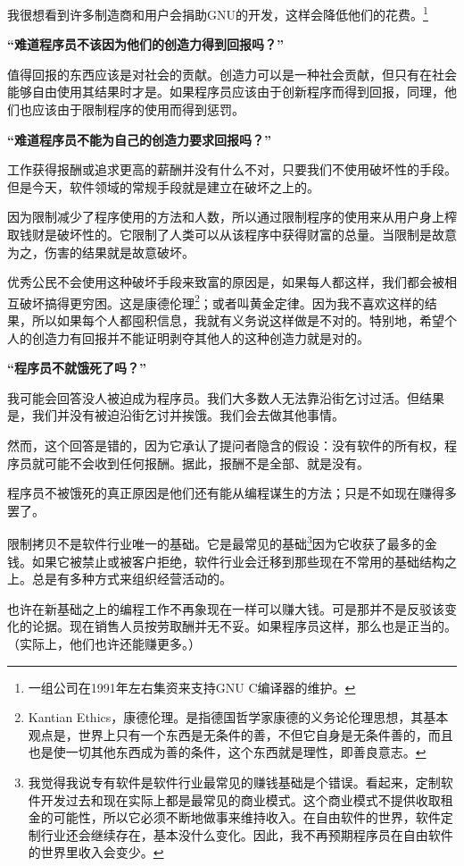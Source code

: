 我很想看到许多制造商和用户会捐助GNU的开发，这样会降低他们的花费。\footnote{一组公司在1991年左右集资来支持GNU C编译器的维护。}\par
\bf“难道程序员不该因为他们的创造力得到回报吗？”\normalall\par
值得回报的东西应该是对社会的贡献。创造力可以是一种社会贡献，但只有在社会能够自由使用其结果时才是。如果程序员应该由于创新程序而得到回报，同理，他们也应该由于限制程序的使用而得到惩罚。\par
\bf“难道程序员不能为自己的创造力要求回报吗？”\normalall\par
工作获得报酬或追求更高的薪酬并没有什么不对，只要我们不使用破坏性的手段。但是今天，软件领域的常规手段就是建立在破坏之上的。\par
因为限制减少了程序使用的方法和人数，所以通过限制程序的使用来从用户身上榨取钱财是破坏性的。它限制了人类可以从该程序中获得财富的总量。当限制是故意为之，伤害的结果就是故意破坏。\par
优秀公民不会使用这种破坏手段来致富的原因是，如果每人都这样，我们都会被相互破坏搞得更穷困。这是康德伦理\footnote{Kantian Ethics，康德伦理。是指德国哲学家康德的义务论伦理思想，其基本观点是，世界上只有一个东西是无条件的善，不但它自身是无条件善的，而且也是使一切其他东西成为善的条件，这个东西就是理性，即善良意志。}；或者叫黄金定律。因为我不喜欢这样的结果，所以如果每个人都囤积信息，我就有义务说这样做是不对的。特别地，希望个人的创造力有回报并不能证明剥夺其他人的这种创造力就是对的。\par
\bf“程序员不就饿死了吗？”\normalall\par
我可能会回答没人被迫成为程序员。我们大多数人无法靠沿街乞讨过活。但结果是，我们并没有被迫沿街乞讨并挨饿。我们会去做其他事情。\par
然而，这个回答是错的，因为它承认了提问者隐含的假设：没有软件的所有权，程序员就可能不会收到任何报酬。据此，报酬不是全部、就是没有。\par
程序员不被饿死的真正原因是他们还有能从编程谋生的方法；只是不如现在赚得多罢了。\par
限制拷贝不是软件行业唯一的基础。它是最常见的基础\footnote{我觉得我说专有软件是软件行业最常见的赚钱基础是个错误。看起来，定制软件开发过去和现在实际上都是最常见的商业模式。这个商业模式不提供收取租金的可能性，所以它必须不断地做事来维持收入。在自由软件的世界，软件定制行业还会继续存在，基本没什么变化。因此，我不再预期程序员在自由软件的世界里收入会变少。}因为它收获了最多的金钱。如果它被禁止或被客户拒绝，软件行业会迁移到那些现在不常用的基础结构之上。总是有多种方式来组织经营活动的。\par
也许在新基础之上的编程工作不再象现在一样可以赚大钱。可是那并不是反驳该变化的论据。现在销售人员按劳取酬并无不妥。如果程序员这样，那么也是正当的。（实际上，他们也许还能赚更多。）\par

